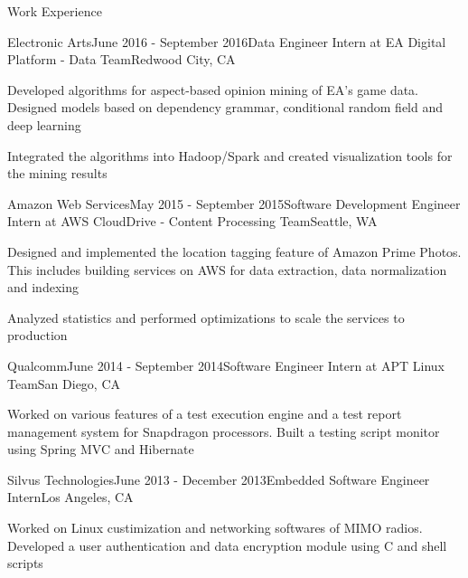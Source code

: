 \documentclass{resume} %
\begin{document}
\begin{rSection}{Work Experience}

\begin{rSubsection}{Electronic Arts}{June 2016 - September 2016}{Data Engineer Intern at EA Digital Platform - Data Team}{Redwood City, CA}
\item Developed algorithms for aspect-based opinion mining of EA's game data. Designed models based on dependency grammar, conditional random field and deep learning
\item Integrated the algorithms into Hadoop/Spark and created visualization tools for the mining results
\end{rSubsection}



\begin{rSubsection}{Amazon Web Services}{May 2015 - September 2015}{Software Development Engineer Intern at AWS CloudDrive - Content Processing Team}{Seattle, WA}
\item Designed and implemented the location tagging feature of Amazon Prime Photos. This includes building services on AWS for data extraction, data normalization and indexing
\item Analyzed statistics and performed optimizations to scale the services to production
\end{rSubsection}


\begin{rSubsection}{Qualcomm}{June 2014 - September 2014}{Software Engineer Intern at APT Linux Team}{San Diego, CA}
\item Worked on various features of a test execution engine and a test report management system for Snapdragon processors. Built a testing script monitor using Spring MVC and Hibernate
\end{rSubsection}


\begin{rSubsection}{Silvus Technologies}{June 2013 - December 2013}{Embedded Software Engineer Intern}{Los Angeles, CA}
\item Worked on Linux custimization and networking softwares of MIMO radios. Developed a user authentication and data encryption module using C and shell scripts
\end{rSubsection}

\end{rSection}
\end{document}

